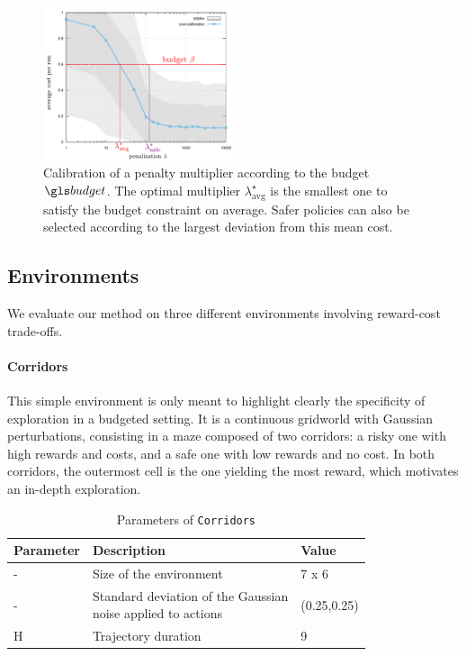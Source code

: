 \begin{figure}[tp]
	\centering
	\includegraphics[width=0.5\textwidth]{img/CalibrationExample}
	\caption{Calibration of a penalty multiplier according to the budget $\budget$. The optimal multiplier $\lambda^{\star}_{\text{avg}}$ is the smallest one to satisfy the budget constraint on average. Safer policies can also be selected according to the largest deviation from this mean cost.}
	\label{fig:Lagrangian}
\end{figure}


\subsection{Environments}
\label{subsec:environments}
We evaluate our method on three different environments involving reward-cost trade-offs.

\paragraph{Corridors}
This simple environment is only meant to highlight clearly the specificity of exploration in a budgeted setting. It is a continuous gridworld with Gaussian perturbations, consisting in a maze composed of two corridors: a risky one with high rewards and costs, and a safe one with low rewards and no cost. In both corridors, the outermost cell is the one yielding the most reward, which motivates an in-depth exploration.

\begin{table}[ht!]
    \centering
    \begin{tabular}{lll}
        \toprule
        Parameter & Description & Value\tabularnewline
        \midrule
        - & Size of the environment & 7 x 6\tabularnewline
        - & \makecell[l]{Standard deviation of the Gaussian \\noise applied to actions} & (0.25,0.25)\tabularnewline
        H & Trajectory duration & 9\tabularnewline
        \bottomrule
    \end{tabular}
    \caption{Parameters of \texttt{Corridors}}
    \label{tab:param-corridors}
\end{table}

